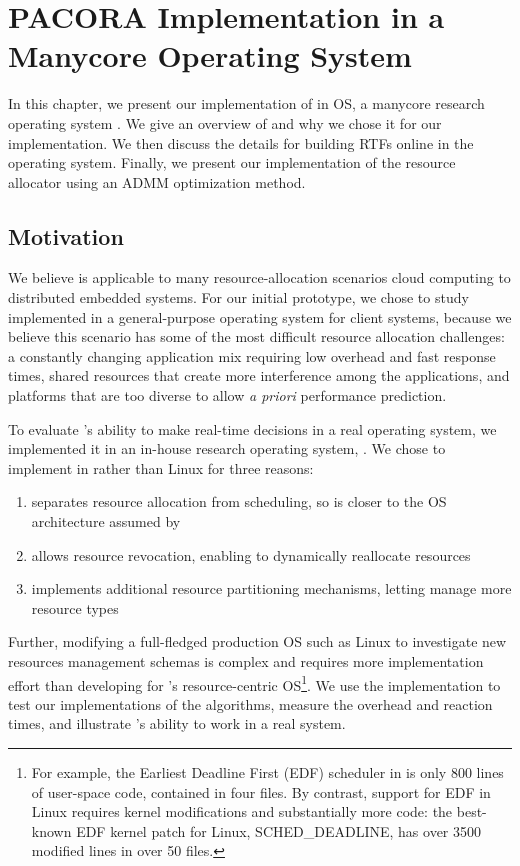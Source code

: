\chapter{PACORA Implementation in a Manycore Operating System}\label{tess_design_ch}
In this chapter, we present our implementation of \pacora in \tess OS, a manycore research operating system \cite{tess_resource, tess, tess_dac, tess_audio, tess_gui}.  We give an overview of \tess and why we chose it for our implementation.  We then discuss the details for building RTFs online in the operating system.  Finally, we present our implementation of the resource allocator using an ADMM optimization method.



\section{Motivation}

We believe \pacora is applicable to many resource-allocation
scenarios cloud computing to distributed embedded systems. For our initial prototype, we chose to study
\pacora implemented in a general-purpose operating system for client
systems, because we believe this scenario has some of the most
difficult resource allocation challenges: a constantly changing
application mix requiring low overhead and fast response times, shared
resources that create more interference among the applications, and
platforms that are too diverse to allow \emph{a priori} performance
prediction.

To evaluate \pacora's ability to make real-time decisions in a real operating system, we implemented it in an in-house research operating system, \tess. We chose to implement in \tess rather than Linux for three reasons:
 \begin{enumerate}\itemsep0pt \parskip0pt 
\item \tess separates resource allocation from scheduling, so is
  closer to the OS architecture assumed by \pacora
\item \tess allows resource revocation, enabling \pacora to dynamically reallocate resources
\item \tess implements additional resource partitioning mechanisms,
  letting \pacora manage  more resource types
\end{enumerate}

 Further, modifying a full-fledged production OS such as Linux to investigate new resources management schemas is complex and
 requires more implementation effort than developing for \tess's resource-centric OS\footnote{For example, the Earliest
 Deadline First (EDF) scheduler in \tess is only 800 lines of user-space code, contained in four files.  By contrast, support for
 EDF in Linux requires kernel modifications and substantially more code: the best-known EDF kernel patch for Linux, SCHED\_DEADLINE, has over 3500 modified lines in over 50 files.}.
We use the \tess implementation to test our implementations of the algorithms, measure the overhead and reaction times, and illustrate \pacora's ability to work in a real system. 

